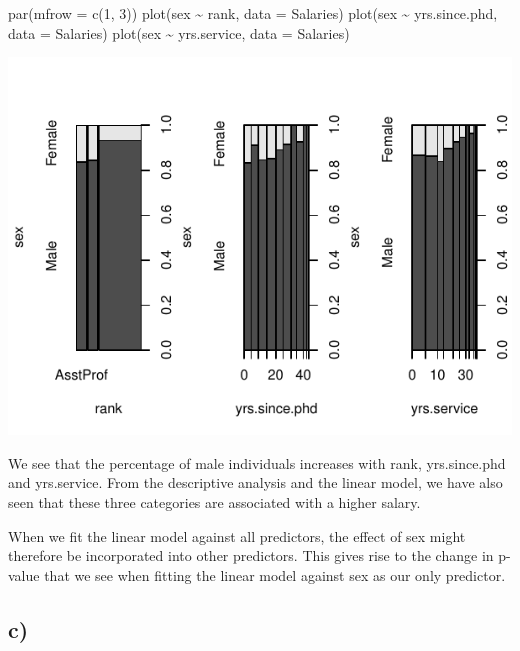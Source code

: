 \documentclass[
]{article}
\newenvironment{Shaded}{\begin{snugshade}}{\end{snugshade}}
\newcommand{\AttributeTok}[1]{\textcolor[rgb]{0.77,0.63,0.00}{#1}}
\newcommand{\DecValTok}[1]{\textcolor[rgb]{0.00,0.00,0.81}{#1}}
\newcommand{\FunctionTok}[1]{\textcolor[rgb]{0.00,0.00,0.00}{#1}}
\newcommand{\NormalTok}[1]{#1}
\newcommand{\SpecialCharTok}[1]{\textcolor[rgb]{0.00,0.00,0.00}{#1}}
\begin{document}
\begin{Shaded}
\begin{Highlighting}[]
\FunctionTok{par}\NormalTok{(}\AttributeTok{mfrow =} \FunctionTok{c}\NormalTok{(}\DecValTok{1}\NormalTok{, }\DecValTok{3}\NormalTok{))}
\FunctionTok{plot}\NormalTok{(sex }\SpecialCharTok{\textasciitilde{}}\NormalTok{ rank, }\AttributeTok{data =}\NormalTok{ Salaries)}
\FunctionTok{plot}\NormalTok{(sex }\SpecialCharTok{\textasciitilde{}}\NormalTok{ yrs.since.phd, }\AttributeTok{data =}\NormalTok{ Salaries)}
\FunctionTok{plot}\NormalTok{(sex }\SpecialCharTok{\textasciitilde{}}\NormalTok{ yrs.service, }\AttributeTok{data =}\NormalTok{ Salaries)}
\end{Highlighting}
\end{Shaded}

\begin{center}\includegraphics{Compulsory-1_files/figure-latex/unnamed-chunk-6-1} \end{center}

We see that the percentage of male individuals increases with rank,
yrs.since.phd and yrs.service. From the descriptive analysis and the
linear model, we have also seen that these three categories are
associated with a higher salary.

When we fit the linear model against all predictors, the effect of sex
might therefore be incorporated into other predictors. This gives rise
to the change in p-value that we see when fitting the linear model
against sex as our only predictor.

\hypertarget{c-1}{%
\subsection{c)}\label{c-1}}
\end{document}
